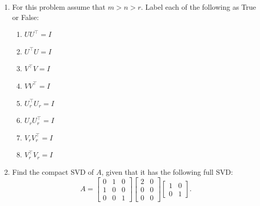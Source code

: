 \documentclass[10pt]{article}
\begin{document}
\begin{enumerate}[label=(\alph*)]
\item For this problem assume that $m > n > r$. Label each of the following as True or False:

\begin{enumerate}[label=(\alph*)]
    \item $UU^\top = I$

    \vspace{3cm}

    \item $U^\top U = I$

    \vspace{3cm}

    \item $V^\top V = I$

    \vspace{3cm}

    \item $VV^\top = I$

    \vspace{3cm}

    \item $U_r^\top U_r = I$

    \vspace{3cm}

    \item $U_r U_r^\top = I$

    \vspace{3cm}

    \item $V_r V_r^\top = I$

    \vspace{3cm}

    \item $V_r^\top V_r = I$

    \vspace{3cm}
\end{enumerate}

\item Find the compact SVD of $A$, given that it has the following full SVD:
\[
A = \begin{bmatrix} 0 & 1 & 0 \\ 1 & 0 & 0 \\ 0 & 0 & 1 \end{bmatrix} \begin{bmatrix} 2 & 0 \\ 0 & 0 \\ 0 & 0 \end{bmatrix} \begin{bmatrix} 1 & 0 \\ 0 & 1 \end{bmatrix}.
\]


\end{enumerate}
\end{document}
